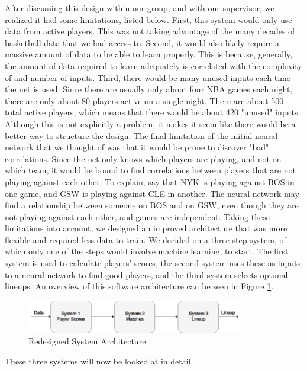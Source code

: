 After discussing this design within our group, and with our supervisor, we realized it had some limitations, listed below. First, this system would only use data from active players. This was not taking advantage of the many decades of basketball data that we had access to. Second, it would also likely require a massive amount of data to be able to learn properly. This is because, generally, the amount of data required to learn adequately is correlated with the complexity of and number of inputs. Third, there would be many unused inputs each time the net is used. Since there are usually only about four NBA games each night, there are only about 80 players active on a single night. There are about 500 total active players, which means that there would be about 420 "unused" inputs. Although this is not explicitly a problem, it makes it seem like there would be a better way to structure the design. The final limitation of the initial neural network that we thought of was that it would be prone to discover "bad" correlations. 
Since the net only knows which players are playing, and not on which team, it would be bound to find correlations between players that are not playing against each other. To explain, say that NYK is playing against BOS in one game, and GSW is playing against CLE in another. The neural network may find a relationship between someone on BOS and on GSW, even though they are not playing against each other, and games are independent.
Taking these limitations into account, we designed an improved architecture that was more flexible and required less data to train. We decided on a three step system, of which only one of the steps would involve machine learning, to start. The first system is used to calculate players' scores, the second system uses these as inputs to a neural network to find good players, and the third system selects optimal lineups. An overview of this software architecture can be seen in Figure \ref{fig:second_iteration}.
\begin{figure}[ht]
    \centering
    \includegraphics[width=0.85\textwidth]{figures/second_iteration}
    \caption{Redesigned System Architecture}
    \label{fig:second_iteration}
\end{figure}

These three systems will now be looked at in detail.

